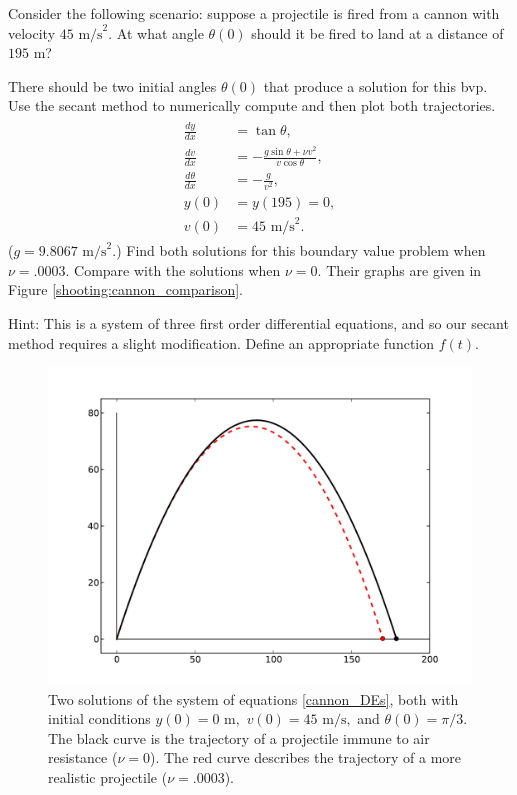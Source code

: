 \begin{problem}
Consider the following scenario: suppose a projectile is fired from a cannon with velocity $45\text{ m/s}^2.$ At what angle $\theta(0)$ should it be fired to land at a distance of $195\text{ m}$? 

There should be two initial angles $\theta(0)$ that produce a solution for this bvp. Use the secant method to numerically compute and then plot both trajectories.
\begin{align}
	\label{cannon_shooting}
	\begin{split}
\frac{dy}{dx} &= \tan {\theta} ,\\
\frac{dv}{dx} &= -\frac{g \sin{\theta} + \nu v^2}{v \cos{\theta}},\\
\frac{d\theta}{dx} &= -\frac{g}{v^2},\\
y(0)&= y(195) = 0,\\
v(0) &= 45 \text{ m/s}^2.
	\end{split}
\end{align}
($g = 9.8067\text{ m/s}^2.$) Find both solutions for this boundary value problem when $\nu = .0003$. Compare with the solutions when $\nu = 0.$ Their graphs are given in Figure \eqref{shooting:cannon_comparison}.

Hint: This is a system of three first order differential equations, and so our secant method requires a slight modification. Define an appropriate function $f(t)$. 
\end{problem}

\begin{figure}[ht]
\centering
\includegraphics[width=\textwidth]{Cannon_with_AirResistance.pdf}
\caption{Two solutions of the system of equations \eqref{cannon_DEs}, both with initial conditions  $y(0) = 0 \text{ m},$ $ v(0) = 45 \text{ m/s},$ and $\theta(0)=\pi/3$. The black curve is the trajectory of a projectile immune to air resistance ($\nu = 0$). The red curve describes the trajectory of a more realistic projectile ($\nu = .0003$). }
\label{shooting:cannon_comparison}
\end{figure}



